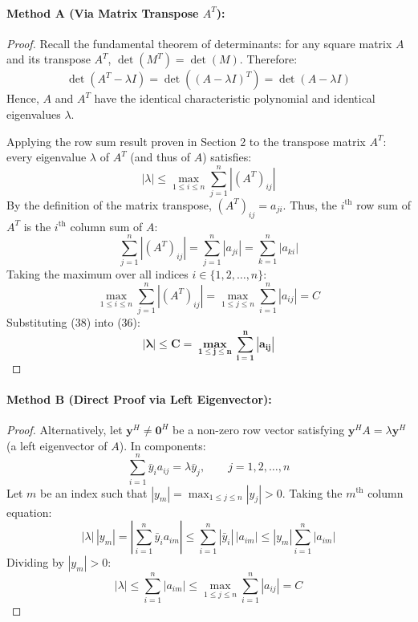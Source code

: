 \documentclass[11pt,a4paper]{article}
\newcommand{\abs}[1]{\left\lvert#1\right\rvert}
\begin{document}
\paragraph{Method A (Via Matrix Transpose $A^T$):}
\begin{proof}
Recall the fundamental theorem of determinants: for any square matrix $A$ and its transpose $A^T$, $\det(M^T) = \det(M)$. Therefore:
\begin{equation}
\det(A^T - \lambda I) = \det\left((A - \lambda I)^T\right) = \det(A - \lambda I)
\end{equation}
Hence, $A$ and $A^T$ have the identical characteristic polynomial and identical eigenvalues $\lambda$.

Applying the row sum result proven in Section 2 to the transpose matrix $A^T$: every eigenvalue $\lambda$ of $A^T$ (and thus of $A$) satisfies:
\begin{equation}
\abs{\lambda} \le \max_{1 \le i \le n} \sum_{j=1}^n \abs{(A^T)_{ij}}
\end{equation}
By the definition of the matrix transpose, $(A^T)_{ij} = a_{ji}$. Thus, the $i^{\text{th}}$ row sum of $A^T$ is the $i^{\text{th}}$ column sum of $A$:
\begin{equation}
\sum_{j=1}^n \abs{(A^T)_{ij}} = \sum_{j=1}^n \abs{a_{ji}} = \sum_{k=1}^n \abs{a_{ki}}
\end{equation}
Taking the maximum over all indices $i \in \{1, 2, \dots, n\}$:
\begin{equation}
\max_{1 \le i \le n} \sum_{j=1}^n \abs{(A^T)_{ij}} = \max_{1 \le j \le n} \sum_{i=1}^n \abs{a_{ij}} = C
\end{equation}
Substituting (38) into (36):
\begin{equation}
\mathbf{\abs{\lambda} \le C = \max_{1 \le j \le n} \sum_{i=1}^n \abs{a_{ij}}}
\end{equation}
\end{proof}

\paragraph{Method B (Direct Proof via Left Eigenvector):}
\begin{proof}
Alternatively, let $\mathbf{y}^H \neq \mathbf{0}^H$ be a non-zero row vector satisfying $\mathbf{y}^H A = \lambda \mathbf{y}^H$ (a left eigenvector of $A$). In components:
\[
\sum_{i=1}^n \bar{y}_i a_{ij} = \lambda \bar{y}_j, \qquad j = 1, 2, \dots, n
\]
Let $m$ be an index such that $\abs{y_m} = \max_{1 \le j \le n} \abs{y_j} > 0$. Taking the $m^{\text{th}}$ column equation:
\[
\abs{\lambda} \, \abs{y_m} = \abs{\sum_{i=1}^n \bar{y}_i a_{im}} \le \sum_{i=1}^n \abs{\bar{y}_i} \, \abs{a_{im}} \le \abs{y_m} \sum_{i=1}^n \abs{a_{im}}
\]
Dividing by $\abs{y_m} > 0$:
\[
\abs{\lambda} \le \sum_{i=1}^n \abs{a_{im}} \le \max_{1 \le j \le n} \sum_{i=1}^n \abs{a_{ij}} = C
\]
\end{proof}
\end{document}
